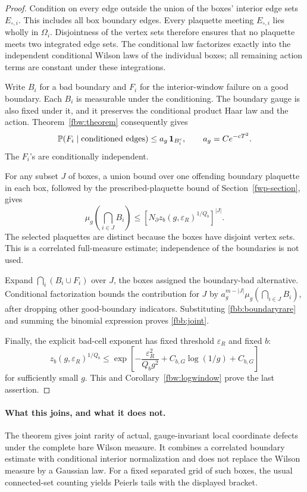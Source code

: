 \begin{proof}
Condition on every edge outside the union of the boxes' interior
edge sets \(E_{\circ,i}\). This includes all box boundary edges.
Every plaquette meeting \(E_{\circ,i}\) lies wholly in \(\Omega_i\).
Disjointness of the vertex sets therefore ensures that no plaquette
meets two integrated edge sets. The conditional law factorizes
exactly into the independent conditional Wilson laws of the
individual boxes; all remaining action terms are constant under
these integrations.

Write \(B_i\) for a bad boundary and \(F_i\) for the interior-window
failure on a good boundary. Each \(B_i\) is measurable under the
conditioning. The boundary gauge is also fixed under it, and it
preserves the conditional product Haar law and the action.
Theorem~\ref{fbw:theorem} consequently gives
\[
 \mathbb P(F_i\mid\hbox{conditioned edges})
 \leq a_g\,\mathbf1_{B_i^c},\qquad a_g=Ce^{-cT^2}.
\]
The \(F_i\)'s are conditionally independent.

For any subset \(J\) of boxes, a union bound over one offending
boundary plaquette in each box, followed by the prescribed-plaquette
bound of Section~\ref{fwp-section}, gives
\begin{equation}
 \mu_g\left(\bigcap_{i\in J}B_i\right)
 \leq \left[N_\partial
              z_b(g,\varepsilon_R)^{1/Q_b}\right]^{|J|}.
 \label{fbb:boundaryrare}
\end{equation}
The selected plaquettes are distinct because the boxes have disjoint
vertex sets. This is a correlated full-measure estimate; independence
of the boundaries is not used.

Expand \(\bigcap_i(B_i\cup F_i)\) over \(J\), the boxes assigned
the boundary-bad alternative. Conditional factorization bounds
the contribution for \(J\) by
\(a_g^{m-|J|}\mu_g(\bigcap_{i\in J}B_i)\), after dropping other
good-boundary indicators. Substituting
\eqref{fbb:boundaryrare} and summing the binomial expression proves
\eqref{fbb:joint}.

Finally, the explicit bad-cell exponent has fixed threshold
\(\varepsilon_R\) and fixed \(b\):
\[
 z_b(g,\varepsilon_R)^{1/Q_b}
 \leq \exp\left[-\frac{\varepsilon_R^2}{Q_b g^2}
                       +C_{b,G}\log(1/g)+C_{b,G}\right]
\]
for sufficiently small \(g\). This and
Corollary~\ref{fbw:logwindow} prove the last assertion.
\end{proof}

\paragraph{What this joins, and what it does not.}
The theorem gives joint rarity of actual, gauge-invariant local
coordinate defects under the complete bare Wilson measure. It
combines a correlated boundary estimate with conditional interior
normalization and does not replace the Wilson measure by a Gaussian
law. For a fixed separated grid of such boxes, the usual connected-set
counting yields Peierls tails with the displayed bracket.

